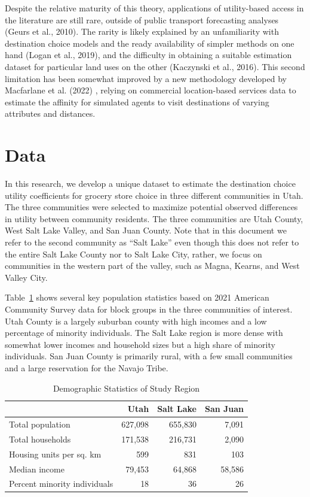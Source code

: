 \documentclass[
  letterpaper,
  DIV=11,
  numbers=noendperiod]{scrreport}
\begin{document}
Despite the relative maturity of this theory, applications of
utility-based access in the literature are still rare, outside of public
transport forecasting analyses (Geurs et al., 2010). The rarity is
likely explained by an unfamiliarity with destination choice models and
the ready availability of simpler methods on one hand (Logan et al.,
2019), and the difficulty in obtaining a suitable estimation dataset for
particular land uses on the other (Kaczynski et al., 2016). This second
limitation has been somewhat improved by a new methodology developed by
Macfarlane et al. (2022) , relying on commercial location-based services
data to estimate the affinity for simulated agents to visit destinations
of varying attributes and distances.

\hypertarget{data}{%
\section{Data}\label{data}}

In this research, we develop a unique dataset to estimate the
destination choice utility coefficients for grocery store choice in
three different communities in Utah. The three communities were selected
to maximize potential observed differences in utility between community
residents. The three communities are Utah County, West Salt Lake Valley,
and San Juan County. Note that in this document we refer to the second
community as ``Salt Lake'' even though this does not refer to the entire
Salt Lake County nor to Salt Lake City, rather, we focus on communities
in the western part of the valley, such as Magna, Kearns, and West
Valley City.

Table~\ref{tbl-acsdata} shows several key population statistics based on
2021 American Community Survey data for block groups in the three
communities of interest. Utah County is a largely suburban county with
high incomes and a low percentage of minority individuals. The Salt Lake
region is more dense with somewhat lower incomes and household sizes but
a high share of minority individuals. San Juan County is primarily
rural, with a few small communities and a large reservation for the
Navajo Tribe.

\hypertarget{tbl-acsdata}{}
\begin{table}
\caption{\label{tbl-acsdata}Demographic Statistics of Study Region }\tabularnewline

\centering
\begin{tabular}[t]{lrrr}
\toprule
 & Utah & Salt Lake & San Juan\\
\midrule
Total population & 627,098 & 655,830 & 7,091\\
Total households & 171,538 & 216,731 & 2,090\\
Housing units per sq. km & 599 & 831 & 103\\
Median income & 79,453 & 64,868 & 58,586\\
Percent minority individuals & 18 & 36 & 26\\
\bottomrule
\end{tabular}
\end{table}
\end{document}
